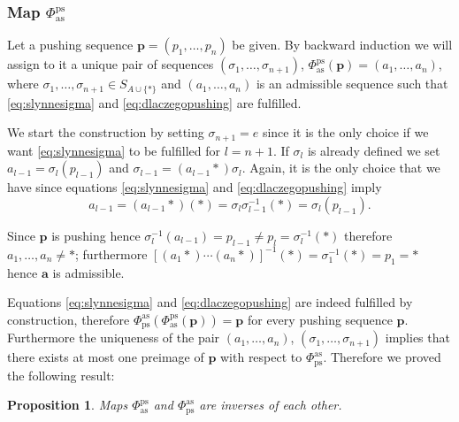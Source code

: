 \documentclass[12pt,dvips]{amsart}
\numberwithin{equation}{section} \numberwithin{figure}{section}
\theoremstyle{plain}
\newtheorem{proposition}[lemma]{Proposition}
\theoremstyle{definition}
\theoremstyle{remark}
\newcommand{\aaa}{{\mathbf{a}}}
\newcommand{\ppp}{{\mathbf{p}}}
\newcommand{\Sn}[1]{{{S}}_{#1}}
\newcommand{\xtra}{\ast}
\newcommand{\fpsas}{\Phi^{\ps}_{\adm}}
\newcommand{\fasps}{\Phi^{\adm}_{\ps}}
\DeclareMathOperator{\adm}{as}
\DeclareMathOperator{\ps}{ps}
\begin{document}



\subsubsection{Map $\fpsas$} \label{subsubsec:fpsas}

Let a pushing sequence $\ppp=(p_1,\dots,p_n)$ be given. By backward
induction we will assign to it a unique pair of sequences
$(\sigma_1,\dots,\sigma_{n+1})$, $\fpsas(\ppp)= (a_1,\dots,a_n)$,
where $\sigma_1,\dots,\sigma_{n+1}\in\Sn{A\cup\{\xtra\}}$ and
$(a_1,\dots,a_n)$ is an admissible sequence such that
\eqref{eq:slynnesigma} and \eqref{eq:dlaczegopushing} are fulfilled.

We start the construction by setting $\sigma_{n+1}=e$ since it is
the only choice if we want \eqref{eq:slynnesigma} to be fulfilled
for $l=n+1$. If $\sigma_l$ is already defined we set
$a_{l-1}=\sigma_{l} (p_{l-1})$ and $\sigma_{l-1}=(a_{l-1} \xtra)
\sigma_l$. Again, it is the only choice that we have since equations
 \eqref{eq:slynnesigma} and \eqref{eq:dlaczegopushing} imply
\begin{equation}
\label{eq:formulanaadmissible} a_{l-1}=(a_{l-1}\xtra)(\xtra)=
\sigma_{l} \sigma_{l-1}^{-1}(\xtra)=\sigma_{l}(p_{l-1}).
\end{equation}

Since $\ppp$ is pushing hence $\sigma_l^{-1}(a_{l-1})=p_{l-1} \neq
p_l=\sigma_l^{-1}(\xtra)$ therefore $a_1,\dots,a_n\neq \xtra$;
furthermore $[(a_1 \xtra) \cdots (a_n
\xtra)]^{-1}(\xtra)=\sigma_1^{-1}(\xtra)=p_{1}=\xtra$ hence $\aaa$
is admissible.

Equations \eqref{eq:slynnesigma} and \eqref{eq:dlaczegopushing} are
indeed fulfilled by construction, therefore
$\fasps(\fpsas(\ppp))=\ppp$ for every pushing sequence $\ppp$.
Furthermore the uniqueness of the pair $(a_1,\dots,a_n)$,
$(\sigma_1,\dots,\sigma_{n+1})$ implies that there exists at most
one preimage of $\ppp$ with respect to $\fasps$. Therefore we proved
the following result:
\begin{proposition}
Maps $\fpsas$ and $\fasps$ are inverses of each other.
\end{proposition}
\end{document}
